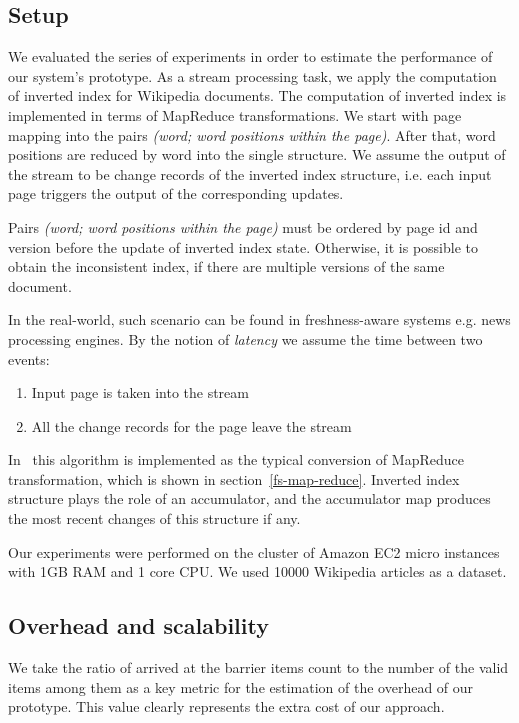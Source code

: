
\label{fs-experiments-section}

\subsection{Setup}
We evaluated the series of experiments in order to estimate the performance of our system's prototype. As a stream processing task, we apply the computation of inverted index for Wikipedia documents. The computation of inverted index is implemented in terms of MapReduce transformations. We start with page mapping into the pairs {\it (word; word positions within the page)}. After that, word positions are reduced by word into the single structure. We assume the output of the stream to be change records of the inverted index structure, i.e. each input page triggers the output of the corresponding updates. 

Pairs {\it (word; word positions within the page)} must be ordered by page id and version before the update of inverted index state. Otherwise, it is possible to obtain the inconsistent index, if there are multiple versions of the same document.  

In the real-world, such scenario can be found in freshness-aware systems e.g. news processing engines. By the notion of {\it latency} we assume the time between two events: 
\begin{enumerate}
    \item Input page is taken into the stream
    \item All the change records for the page leave the stream
\end{enumerate}

In \FlameStream\ this algorithm is implemented as the typical conversion of MapReduce transformation, which is shown in section~\ref{fs-map-reduce}. Inverted index structure plays the role of an accumulator, and the accumulator map produces the most recent changes of this structure if any.

Our experiments were performed on the cluster of Amazon EC2 micro instances with 1GB RAM and 1 core CPU. We used 10000 Wikipedia articles as a dataset. 

\subsection{Overhead and scalability}

We take the ratio of arrived at the barrier items count to the number of the valid items among them as a key metric for the estimation of the overhead of our prototype. This value clearly represents the extra cost of our approach.

